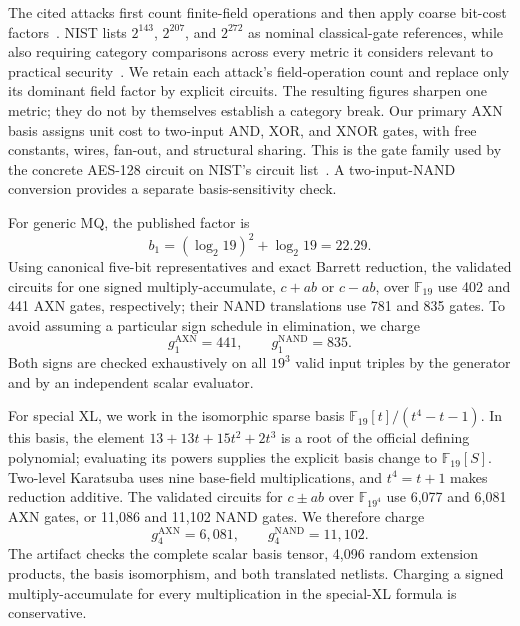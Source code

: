 \documentclass[11pt]{article}
\newcommand{\F}{\mathbb F}
\begin{document}
The cited attacks first count finite-field operations and then apply coarse
bit-cost factors~\cite{Beullens2024SNOVA,Cabarcas2025SNOVA}.  NIST lists
$2^{143}$, $2^{207}$, and $2^{272}$ as nominal classical-gate references, while
also requiring category comparisons across every metric it considers relevant
to practical security~\cite{NISTPQCCriteria}.  We retain each attack's
field-operation count and replace only its dominant field factor by explicit
circuits.  The resulting figures sharpen one metric; they do not by themselves
establish a category break.  Our primary AXN basis assigns unit cost to two-input
AND, XOR, and XNOR gates, with free constants, wires, fan-out, and structural
sharing.  This is the gate family used by the concrete AES-128 circuit on
NIST's circuit list~\cite{NISTCircuitComplexity}.  A two-input-NAND conversion
provides a separate basis-sensitivity check.

For generic MQ, the published factor is
\begin{equation}\label{eq:published-f19-factor}
 b_1=(\log_2 19)^2+\log_2 19=22.29.
\end{equation}
Using canonical five-bit representatives and exact Barrett reduction, the
validated circuits for one signed multiply-accumulate, $c+ab$ or $c-ab$, over
$\F_{19}$ use 402 and 441 AXN gates, respectively; their NAND translations use 781 and 835 gates.  To avoid
assuming a particular sign schedule in elimination, we charge
\begin{equation}\label{eq:axn-f19-factor}
 g_1^{\mathrm{AXN}}=441,
 \qquad g_1^{\mathrm{NAND}}=835.
\end{equation}
Both signs are checked exhaustively on all $19^3$ valid input triples by the
generator and by an independent scalar evaluator.

For special XL, we work in the isomorphic sparse basis
$\F_{19}[t]/(t^4-t-1)$.  In this basis, the element
$13+13t+15t^2+2t^3$ is a root of the official defining polynomial; evaluating
its powers supplies the explicit basis change to $\F_{19}[S]$.  Two-level
Karatsuba uses nine base-field multiplications, and $t^4=t+1$ makes reduction
additive.  The validated circuits for $c\mathbin{\pm}ab$ over $\F_{19^4}$ use
6,077 and 6,081 AXN gates, or 11,086 and 11,102 NAND gates.  We therefore
charge
\begin{equation}\label{eq:axn-f194-factor}
 g_4^{\mathrm{AXN}}=6{,}081,
 \qquad g_4^{\mathrm{NAND}}=11{,}102.
\end{equation}
The artifact checks the complete scalar basis tensor, 4,096 random extension
products, the basis isomorphism, and both translated netlists.  Charging a
signed multiply-accumulate for every multiplication in the special-XL formula
is conservative.
\end{document}
